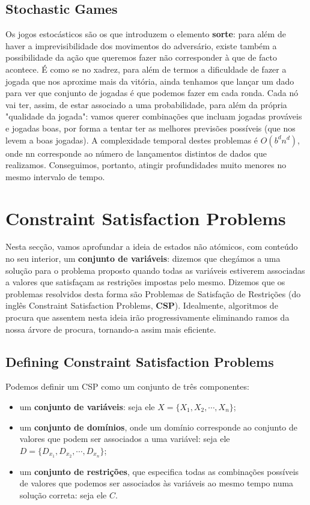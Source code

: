 \documentclass[11pt]{article}
\begin{document}
\subsection{Stochastic Games}

Os jogos estocásticos são os que introduzem o elemento \textbf{sorte}: para além de haver a imprevisibilidade dos movimentos do adversário, existe também a possibilidade da ação que queremos fazer não corresponder à que de facto acontece. É como se no xadrez, para além de termos a dificuldade de fazer a jogada que nos aproxime mais da vitória, ainda tenhamos que lançar um dado para ver que conjunto de jogadas é que podemos fazer em cada ronda. Cada nó vai ter, assim, de estar associado a uma probabilidade, para além da própria "qualidade da jogada": vamos querer combinações que incluam jogadas prováveis e jogadas boas, por forma a tentar ter as melhores previsões possíveis (que nos levem a boas jogadas). A complexidade temporal destes problemas é $O(b^dn^d)$, onde nn corresponde ao número de lançamentos distintos de dados que realizamos. Conseguimos, portanto, atingir profundidades muito menores no mesmo intervalo de tempo.

\newpage
\section{Constraint Satisfaction Problems}

Nesta secção, vamos aprofundar a ideia de estados não atómicos, com conteúdo no seu interior, um \textbf{conjunto de variáveis}: dizemos que chegámos a uma solução para o problema proposto quando todas as variáveis estiverem associadas a valores que satisfaçam as restrições impostas pelo mesmo. Dizemos que os problemas resolvidos desta forma são Problemas de Satisfação de Restrições (do inglês Constraint Satisfaction Problems, \textbf{CSP}). Idealmente, algoritmos de procura que assentem nesta ideia irão progressivamente eliminando ramos da nossa árvore de procura, tornando-a assim mais eficiente.

\subsection{Defining Constraint Satisfaction Problems}

Podemos definir um CSP como um conjunto de três componentes:
\begin{itemize}[itemsep=0pt]
    \item um \textbf{conjunto de variáveis}: seja ele $X=\{X_1,X_2,\cdots,X_n\}$;
    \item um \textbf{conjunto de domínios}, onde um domínio corresponde ao conjunto de valores que podem ser associados a uma variável: seja ele $D=\{D_{x_1},D_{x_2},\cdots,D_{x_n}\}$;
    \item um \textbf{conjunto de restrições}, que especifica todas as combinações possíveis de valores que podemos ser associados às variáveis ao mesmo tempo numa solução correta: seja ele $C$.
\end{itemize}
\end{document}
